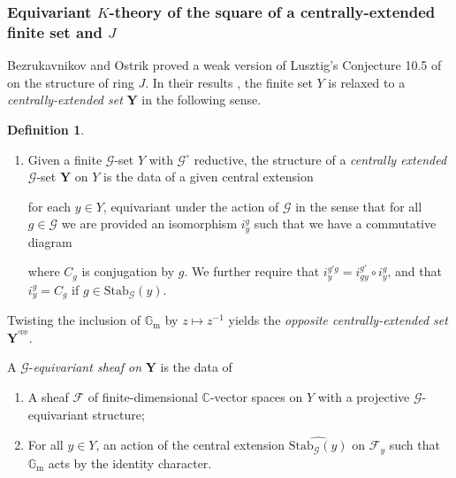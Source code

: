 \documentclass[10pt]{article}
\newcommand{\stab}[2]{\mathrm{Stab}_{#1}(#2)}
\newcommand{\id}{\mathrm{id}}
\newcommand{\opp}{^\mathrm{opp}}
\newcommand{\Ff}{\mathcal{F}}
\newcommand{\C}{\mathbb{C}}
\newcommand{\Gm}{{\mathbb{G}_\mathrm{m}}}
\theoremstyle{definition}
\newtheorem{dfn}{Definition}
\theoremstyle{remark}
\newcommand{\Yext}{\mathbf{Y}}
\newcommand{\Zz}{\mathcal{G}}
\newcommand{\Y}{\mathbf{Y}}
\begin{document}
\subsubsection{Equivariant $K$-theory of the square of a centrally-extended finite set and $J$}
\label{subsubsection Equivariant K-theory of square of centrally extended}
Bezrukavnikov and Ostrik proved a weak version of Lusztig's Conjecture 10.5 of
\cite{cellsIV} on the structure of ring $J$. In their results \cite{BO}, the finite set $Y$ is relaxed to a 
\emph{centrally-extended set} $\Y$ in the following sense.
%
\begin{dfn}
\begin{enumerate}
\item[(a)]
Given a finite $\Zz$-set $Y$ with $\Zz^\circ$ reductive, the structure of a \emph{centrally extended} 
$\Zz$-set $\Yext$ on $Y$ is the data of a given central extension
%
\begin{center}
 \end{center} 
%
for each $y\in Y$, equivariant under the action of $\Zz$ in the sense that for all $g\in \Zz$ we are provided an isomorphism $i_y^g$ such that we have a commutative diagram
%
%
\begin{center}
 \end{center} 
%
where $C_g$ is conjugation by $g$. We further require that $i^{g'g}_y=i^{g'}_{gy}\circ i^g_{y}$, 
and that $i_y^g=C_g$ if $g\in\stab{\Zz}{y}$.
\end{enumerate}
%
\item[(b)]
Twisting the inclusion of $\Gm$ by $z\mapsto z^{-1}$ yields
the \emph{opposite centrally-extended set} $\Yext^{\opp}$.
%
\item[(c)] 
A $\Zz$-\emph{equivariant sheaf on} $\Yext$ is the data of 
%
\begin{enumerate}
\item[(i)] 
A sheaf $\Ff$ of finite-dimensional $\C$-vector spaces on $Y$ with a projective $\Zz$-equivariant structure;
%
\item[(ii)]
For all $y\in Y$, an action of the central extension $\widehat{\stab{\Zz}{y}}$ on $\Ff_y$ such that
$\Gm$ acts by the identity character.
\end{enumerate}
\end{dfn}
\end{document}
